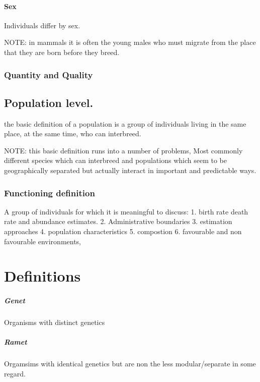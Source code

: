 \documentclass[]{article}
\let\oldparagraph\paragraph
\renewcommand{\paragraph}[1]{\oldparagraph{#1}\mbox{}}
\let\oldsubparagraph\subparagraph
\renewcommand{\subparagraph}[1]{\oldsubparagraph{#1}\mbox{}}
\begin{document}
\hypertarget{sex}{%
\paragraph{Sex}\label{sex}}

Individuals differ by sex.

NOTE: in mammals it is often the young males who must migrate from the
place that they are born before they breed.

\hypertarget{quantity-and-quality}{%
\subsubsection{Quantity and Quality}\label{quantity-and-quality}}

\hypertarget{population-level.}{%
\subsection{Population level.}\label{population-level.}}

the basic definition of a population is a group of individuals living in
the same place, at the same time, who can interbreed.

NOTE: this basic definition runs into a number of problems, Most
commonly different species which can interbreed and populations which
seem to be geographically separated but actually interact in important
and predictable ways.

\hypertarget{functioning-definition}{%
\subsubsection{Functioning definition}\label{functioning-definition}}

A group of individuals for which it is meaningful to discuss: 1. birth
rate death rate and abundance estimates. 2. Administrative boundaries 3.
estimation approaches 4. population characteristics 5. compostion 6.
favourable and non favourable environments,

\hypertarget{definitions-1}{%
\section{Definitions}\label{definitions-1}}

\hypertarget{genet}{%
\subparagraph{Genet}\label{genet}}

Organisms with distinct genetics

\hypertarget{ramet}{%
\subparagraph{Ramet}\label{ramet}}

Orgamsims with identical genetics but are non the less modular/separate
in some regard.
\end{document}

